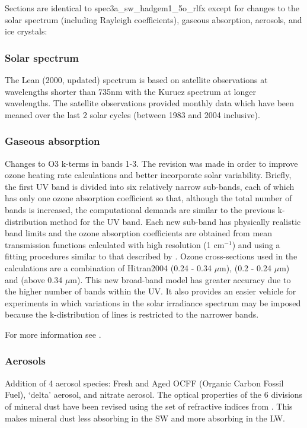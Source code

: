 Sections are identical to spec3a\_sw\_hadgem1\_5o\_rlfx except for changes to the solar spectrum (including Rayleigh coefficients), gaseous absorption, aerosols, and ice crystals:

\subsubsection*{Solar spectrum}

The Lean (2000, updated) spectrum \citep{Lean00} is based on satellite observations at wavelengths shorter than 735nm with the Kurucz spectrum at longer wavelengths. The satellite observations provided monthly data which have been meaned over the last 2 solar cycles (between 1983 and 2004 inclusive).


\subsubsection*{Gaseous absorption}

Changes to O3 k-terms in bands 1-3. The revision was made in order to improve ozone heating rate calculations and better incorporate solar variability. Briefly, the first UV band is divided into six relatively narrow sub-bands, each of which has only one ozone absorption coefficient so that, although the total number of bands is increased, the computational demands are similar to the previous k-distribution method for the UV band. Each new sub-band has physically realistic band limits and the ozone absorption coefficients are obtained from mean transmission functions calculated with high resolution (1 cm$^{-1}$) and using a fitting procedures similar to that described by \citet{Chou96}. Ozone cross-sections used in the calculations are a combination of Hitran2004 (0.24 - 0.34 $\mu$m), \citet{Molina86} (0.2 - 0.24 $\mu$m) and \citet{Voigt01} (above 0.34 $\mu$m). This new broad-band model has greater accuracy due to the higher number of bands within the UV. It also provides an easier vehicle for experiments in which variations in the solar irradiance spectrum may be imposed because the k-distribution of lines is restricted to the narrower bands.

For more information see \citet{Wenyi08}.


\subsubsection*{Aerosols}
 
Addition of 4 aerosol species: Fresh and Aged OCFF (Organic Carbon Fossil Fuel), `delta' aerosol, and nitrate aerosol. The optical properties of the 6 divisions of mineral dust have been revised using the set of refractive indices from \citet{Balkanski07}. This makes mineral dust less absorbing in the SW and more absorbing in the LW.


